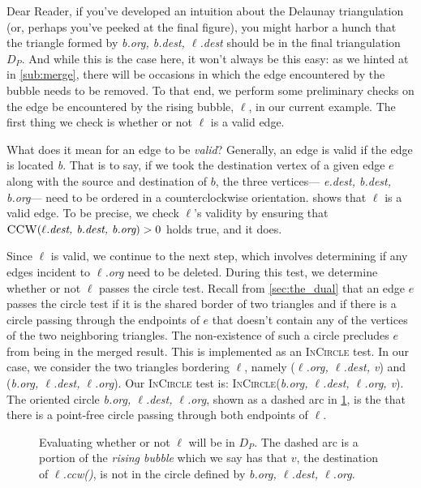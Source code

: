 \documentclass[12pt,twoside]{reedthesis}
\begin{document}
      Dear Reader, if you've developed an intuition about the Delaunay triangulation (or, perhaps you've peeked at the final figure), you might harbor a hunch that the triangle formed by \textit{b.org, b.dest, $\ell$.dest} should be in the final triangulation $D_{P}$. And while this is the case here, it won't always be this easy: as we hinted at in \cref{sub:merge}, there will be occasions in which the edge encountered by the bubble needs to be removed. To that end, we perform some preliminary checks on the edge be encountered by the rising bubble, $\ell$, in our current example. The first thing we check is whether or not $\ell$ is a valid edge. \par

      What does it mean for an edge to be \emph{valid}? Generally, an edge is valid if the edge is located  \emph{b}. That is to say, if we took the destination vertex of a given edge $e$ along with the source and destination of $b$, the three vertices--- \textit{e.dest, b.dest, b.org}--- need to be ordered in a counterclockwise orientation.   shows that $\ell$ is a valid edge. To be precise, we check $\ell$'s validity by ensuring that $\textsc{CCW}(\textit{$\ell$.dest, b.dest, b.org}) > 0$ holds true, and it does.\par

      Since $\ell$ is valid, we continue to the next step, which involves determining if any edges incident to \textit{$\ell$.org} need to be deleted. During this test, we determine whether or not $\ell$ passes the circle test. Recall from \cref{sec:the_dual} that an edge $e$ passes the circle test if it is the shared border of two triangles and if there is a circle passing through the endpoints of $e$ that doesn't contain any of the vertices of the two neighboring triangles. The non-existence of such a circle precludes $e$ from being in the merged result. This is implemented as an \textsc{InCircle} test. In our case, we consider the two triangles bordering $\ell$, namely (\textit{$\ell$.org, $\ell$.dest, v}) and (\textit{b.org, $\ell$.dest, $\ell$.org}). Our \textsc{InCircle} test is: \textsc{InCircle}(\textit{b.org, $\ell$.dest, $\ell$.org, v}). The oriented circle \textit{b.org, $\ell$.dest, $\ell$.org}, shown as a dashed arc in \cref{fig:del_knit1}, is the  that there is a point-free circle passing through both endpoints of $\ell$.\par

      \begin{figure}[H]
      \ContinuedFloat
      \centering
        \begin{subtable}{\textwidth}
          \centering
          
          \caption{Evaluating whether or not $\ell$ will be in $D_{P}$. The dashed arc is a portion of the \emph{rising bubble} which we say has  that $v$, the destination of \textit{$\ell$.ccw()}, is not in the circle defined by \textit{b.org, $\ell$.dest, $\ell$.org}.}
          \label{fig:del_knit1}
        \end{subtable}
      \end{figure}
\end{document}
